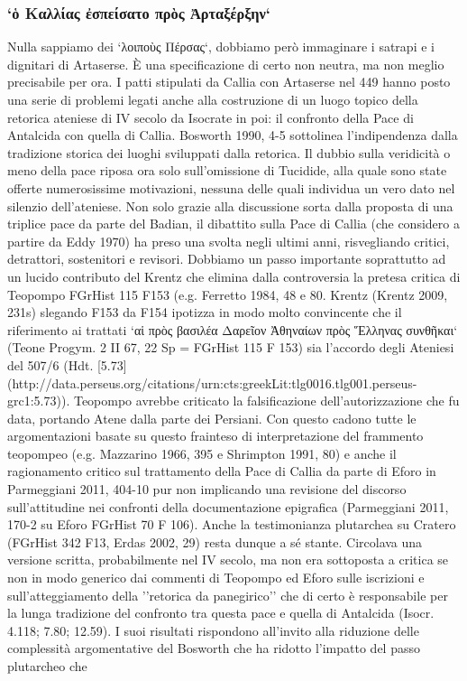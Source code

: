 {            \subsubsection{`ὁ Καλλίας ἐσπείσατο πρὸς Ἀρταξέρξην`}
            Nulla sappiamo dei  `λοιποὺς Πέρσας`, dobbiamo però immaginare i satrapi e i dignitari di Artaserse. È una specificazione di certo non neutra, ma non meglio precisabile per ora. I patti stipulati da Callia con Artaserse  nel 449 hanno posto una serie di problemi legati anche alla costruzione di un luogo topico della retorica ateniese di IV secolo da Isocrate in poi: il confronto della Pace di Antalcida con quella di Callia. Bosworth 1990, 4-5 sottolinea l'indipendenza dalla tradizione storica dei luoghi sviluppati dalla retorica. Il dubbio sulla veridicità o meno della pace riposa ora solo sull'omissione di Tucidide, alla quale sono state offerte numerosissime motivazioni, nessuna delle quali individua un vero dato nel silenzio dell'ateniese. Non solo grazie alla discussione sorta dalla proposta di una triplice pace da parte del Badian, il dibattito sulla Pace di Callia (che considero a partire da Eddy 1970) ha preso una svolta negli ultimi anni, risvegliando critici, detrattori, sostenitori e revisori. Dobbiamo un passo importante soprattutto ad un lucido contributo del Krentz che elimina dalla controversia la pretesa critica di Teopompo  FGrHist 115 F153 (e.g. Ferretto 1984, 48 e 80. Krentz (Krentz 2009, 231s) slegando F153 da F154 ipotizza in modo molto convincente che il riferimento ai trattati `αἱ πρὸς βασιλέα Δαρεῖον Ἀθηναίων πρὸς Ἕλληνας συνθῆκαι` (Teone Progym. 2 II 67, 22 Sp = FGrHist 115 F 153) sia l'accordo degli Ateniesi del 507/6 (Hdt. [5.73](http://data.perseus.org/citations/urn:cts:greekLit:tlg0016.tlg001.perseus-grc1:5.73)). Teopompo  avrebbe criticato la falsificazione dell'autorizzazione che fu data, portando Atene dalla parte dei Persiani. Con questo cadono tutte le argomentazioni basate su questo frainteso di interpretazione del frammento teopompeo (e.g. Mazzarino 1966, 395 e Shrimpton 1991, 80) e anche il ragionamento critico sul trattamento della Pace di Callia da parte di Eforo in Parmeggiani 2011, 404-10 pur non implicando una revisione del discorso sull'attitudine nei confronti della documentazione epigrafica (Parmeggiani 2011, 170-2 su Eforo FGrHist 70 F 106). Anche la testimonianza plutarchea su Cratero (FGrHist 342 F13, Erdas 2002, 29) resta dunque a sé stante. Circolava una versione scritta, probabilmente nel IV secolo, ma non era sottoposta a critica se non in modo generico dai commenti di Teopompo  ed Eforo sulle iscrizioni e sull'atteggiamento della ''retorica da panegirico'' che di certo è responsabile per la lunga tradizione del confronto tra questa pace e quella di Antalcida (Isocr. 4.118; 7.80; 12.59).  I suoi risultati rispondono all'invito alla riduzione delle complessità argomentative del Bosworth che ha ridotto l'impatto del passo plutarcheo che 
}
